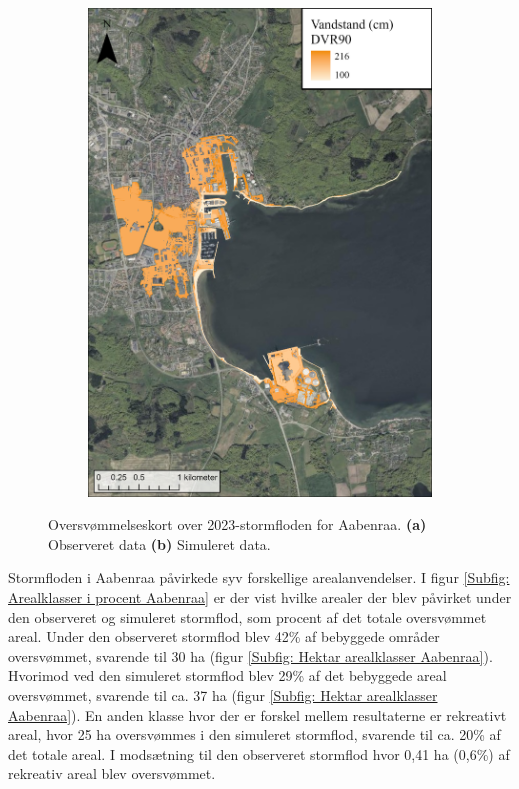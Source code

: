 \begin{figure}[H]
\begin{subfigure}[t]{0.5\textwidth}
        \includegraphics[width=0.95\linewidth]{images/Resultater/2023Model/2023 model_aabenraa.jpg}
        \caption{}
        \label{Subfig: Model Aabenraa}
    \end{subfigure}
    \caption{Oversvømmelseskort over 2023-stormfloden for Aabenraa. \textbf{(a)} Observeret data \textbf{(b)} Simuleret data.}
    \label{Figur: Målt & simuleret Aabenraa}
\end{figure}
Stormfloden i Aabenraa påvirkede syv forskellige arealanvendelser. I figur \ref{Subfig: Arealklasser i procent Aabenraa} er der vist hvilke arealer der blev påvirket under den observeret og simuleret stormflod, som procent af det totale oversvømmet areal. Under den observeret stormflod blev 42\% af bebyggede områder oversvømmet, svarende til 30 ha (figur \ref{Subfig: Hektar arealklasser Aabenraa}). Hvorimod ved den simuleret stormflod blev 29\% af det bebyggede areal oversvømmet, svarende til ca. 37 ha (figur \ref{Subfig: Hektar arealklasser Aabenraa}). En anden klasse hvor der er forskel mellem resultaterne er rekreativt areal, hvor 25 ha oversvømmes i den simuleret stormflod, svarende til ca. 20\% af det totale areal. I modsætning til den observeret stormflod hvor 0,41 ha (0,6\%) af rekreativ areal blev oversvømmet.
